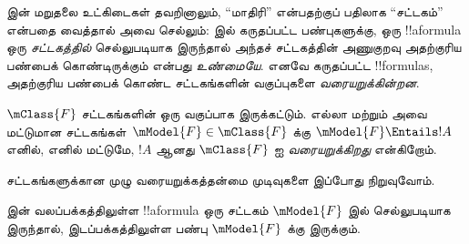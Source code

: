 \documentclass[../../../include/open-logic-section]{subfiles}
\begin{document}


 இன் மறுதலை உட்கிடைகள் தவறினாலும்,
``மாதிரி'' என்பதற்குப் பதிலாக ``சட்டகம்'' என்பதை வைத்தால் அவை செல்லும்:
 இல் கருதப்பட்ட பண்புகளுக்கு, ஒரு !!a{formula}
ஒரு \emph{சட்டகத்தில்} செல்லுபடியாக இருந்தால் அந்தச் சட்டகத்தின் அணுகுறவு
அதற்குரிய பண்பைக் கொண்டிருக்கும் என்பது \emph{உண்மையே}. எனவே கருதப்பட்ட
!!{formula}s, அதற்குரிய பண்பைக் கொண்ட சட்டகங்களின் வகுப்புகளை
\emph{வரையறுக்கின்றன}.

\begin{defn}
  $\mClass{F}$ சட்டகங்களின் ஒரு வகுப்பாக இருக்கட்டும். எல்லா மற்றும்
  அவை மட்டுமான சட்டகங்கள்~$\mModel{F} \in \mClass{F}$ க்கு
  $\mModel{F} \Entails !A$ எனில், எனில் மட்டுமே, $!A$ ஆனது
  $\mClass{F}$ ஐ \emph{வரையறுக்கிறது} என்கிறோம்.
\end{defn}

சட்டகங்களுக்கான முழு வரையறுக்கத்தன்மை முடிவுகளை இப்போது நிறுவுவோம்.

\begin{thm}
 இன் வலப்பக்கத்திலுள்ள !!a{formula} ஒரு சட்டகம்
$\mModel{F}$ இல் செல்லுபடியாக இருந்தால், இடப்பக்கத்திலுள்ள பண்பு
$\mModel{F}$ க்கு இருக்கும்.
\end{thm}
\end{document}
